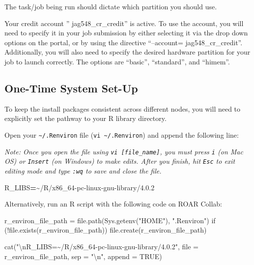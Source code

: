 \documentclass[
]{book}
\newenvironment{Shaded}{\begin{snugshade}}{\end{snugshade}}
\newcommand{\NormalTok}[1]{#1}
\newcommand{\OperatorTok}[1]{\textcolor[rgb]{0.81,0.36,0.00}{\textbf{#1}}}
\newcommand{\VariableTok}[1]{\textcolor[rgb]{0.00,0.00,0.00}{#1}}
\begin{document}
The task/job being run should dictate which partition you should use.

Your credit account '' jag548\_cr\_credit'' is active. To use the account, you will need to specify it in your job submission by either selecting it via the drop down options on the portal, or by using the directive ``--account= jag548\_cr\_credit''. Additionally, you will also need to specify the desired hardware partition for your job to launch correctly. The options are ``basic'', ``standard'', and ``himem''.

\subsection{One-Time System Set-Up}\label{one-time-system-set-up}

To keep the install packages consistent across different nodes, you will need to explicitly set the pathway to your R library directory.

Open your \texttt{\textasciitilde{}/.Renviron} file (\texttt{vi\ \textasciitilde{}/.Renviron}) and append the following line:

\emph{Note: Once you open the file using \texttt{vi\ {[}file\_name{]}}, you must press \texttt{i} (on Mac OS) or \texttt{Insert} (on Windows) to make edits. After you finish, hit \texttt{Esc} to exit editing mode and type \texttt{:wq} to save and close the file.}

\begin{Shaded}
\begin{Highlighting}[]
\VariableTok{R\_LIBS}\OperatorTok{=}\NormalTok{\textasciitilde{}/R/x86\_64{-}pc{-}linux{-}gnu{-}library/4.0.2}
\end{Highlighting}
\end{Shaded}

Alternatively, run an R script with the following code on ROAR Collab:

\begin{Shaded}
\begin{Highlighting}[]
\NormalTok{r\_environ\_file\_path = file.path(Sys.getenv("HOME"), ".Renviron")}
\NormalTok{if (!file.exists(r\_environ\_file\_path)) file.create(r\_environ\_file\_path)}

\NormalTok{cat("\textbackslash{}nR\_LIBS=\textasciitilde{}/R/x86\_64{-}pc{-}linux{-}gnu{-}library/4.0.2",}
\NormalTok{    file = r\_environ\_file\_path, sep = "\textbackslash{}n", append = TRUE)}
\end{Highlighting}
\end{Shaded}
\end{document}

